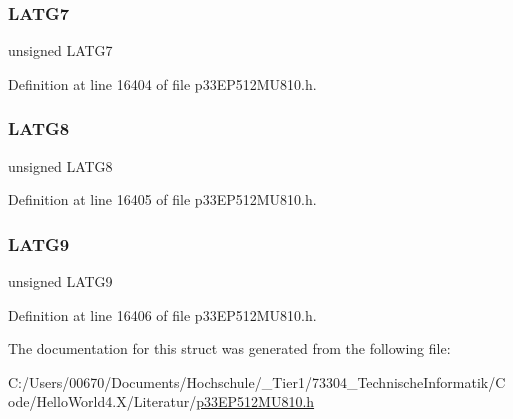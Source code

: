 \subsubsection{\texorpdfstring{L\+A\+T\+G7}{LATG7}}
{\footnotesize\ttfamily unsigned L\+A\+T\+G7}



Definition at line 16404 of file p33\+E\+P512\+M\+U810.\+h.

\mbox{\label{structtag_l_a_t_g_b_i_t_s_a79cfb9c5e7ee54529d10830dd6373e42}} 
\subsubsection{\texorpdfstring{L\+A\+T\+G8}{LATG8}}
{\footnotesize\ttfamily unsigned L\+A\+T\+G8}



Definition at line 16405 of file p33\+E\+P512\+M\+U810.\+h.

\mbox{\label{structtag_l_a_t_g_b_i_t_s_a58344c9b18ea38762745edf0f5936b89}} 
\subsubsection{\texorpdfstring{L\+A\+T\+G9}{LATG9}}
{\footnotesize\ttfamily unsigned L\+A\+T\+G9}



Definition at line 16406 of file p33\+E\+P512\+M\+U810.\+h.



The documentation for this struct was generated from the following file\+:\begin{DoxyCompactItemize}
\item 
C\+:/\+Users/00670/\+Documents/\+Hochschule/\+\_\+\+Tier1/73304\+\_\+\+Technische\+Informatik/\+Code/\+Hello\+World4.\+X/\+Literatur/\hyperlink{p33_e_p512_m_u810_8h}{p33\+E\+P512\+M\+U810.\+h}\end{DoxyCompactItemize}
